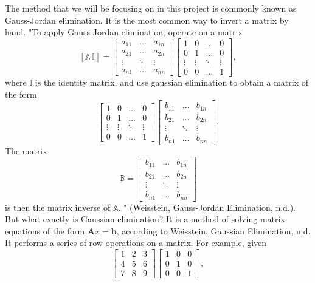 \documentclass{article}
\begin{document}
\par The method that we will be focusing on in this project is commonly known as Gauss-Jordan elimination. It is the most common way to invert a matrix by hand. "To apply Gauss-Jordan elimination, operate on a matrix
$$[\mathbb{A}~\mathbb{I}]=\begin{bmatrix}a_{11} & ... & a_{1n} \\ a_{21} & ... & a_{2n} \\ \vdots & \ddots & \vdots \\ a_{n1} & ... & a_{nn}\end{bmatrix}\begin{bmatrix}1 & 0 & ... & 0\\ 0 & 1 & ... & 0 \\ \vdots & \vdots & \ddots & \vdots \\ 0 & 0 & ... & 1\end{bmatrix},$$
where $\mathbb{I}$ is the identity matrix, and use gaussian elimination to obtain a matrix of the form
$$\begin{bmatrix}1 & 0 & ... & 0\\ 0 & 1 & ... & 0 \\ \vdots & \vdots & \ddots & \vdots \\ 0 & 0 & ... & 1\end{bmatrix}\begin{bmatrix}b_{11} & ... & b_{1n} \\ b_{21} & ... & b_{2n} \\ \vdots & \ddots & \vdots \\ b_{n1} & ... & b_{nn}\end{bmatrix}.$$
The matrix 
$$\mathbb{B}=\begin{bmatrix}b_{11} & ... & b_{1n} \\ b_{21} & ... & b_{2n} \\ \vdots & \ddots & \vdots \\ b_{n1} & ... & b_{nn}\end{bmatrix}$$
is then the matrix inverse of $\mathbb{A}$.
" (Weisstein, Gauss-Jordan Elimination, n.d.). But what exactly is Gaussian elimination? It is a method of solving matrix equations of the form $\mathbf{A}x=\mathbf{b}$, according to Weisstein, Gaussian Elimination, n.d. It performs a series of row operations on a matrix. For example, given 
$$\begin{bmatrix}1 & 2 & 3\\ 4 & 5 & 6 \\ 7 & 8 & 9\end{bmatrix} \begin{bmatrix}1 & 0 & 0 \\ 0 & 1 & 0 \\ 0 & 0 & 1\end{bmatrix},$$
\end{document}
